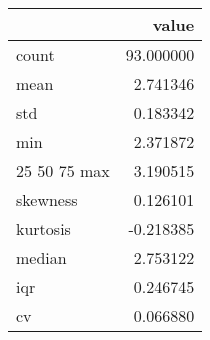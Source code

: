 \begin{tabular}{lr}
\toprule
 & value \\
\midrule
count & 93.000000 \\
mean & 2.741346 \\
std & 0.183342 \\
min & 2.371872 \\
25%
50%
75%
max & 3.190515 \\
skewness & 0.126101 \\
kurtosis & -0.218385 \\
median & 2.753122 \\
iqr & 0.246745 \\
cv & 0.066880 \\
\bottomrule
\end{tabular}

